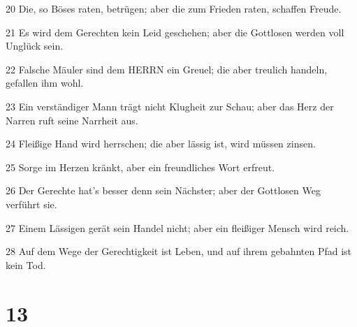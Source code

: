 \par 20 Die, so Böses raten, betrügen; aber die zum Frieden raten, schaffen Freude.
\par 21 Es wird dem Gerechten kein Leid geschehen; aber die Gottlosen werden voll Unglück sein.
\par 22 Falsche Mäuler sind dem HERRN ein Greuel; die aber treulich handeln, gefallen ihm wohl.
\par 23 Ein verständiger Mann trägt nicht Klugheit zur Schau; aber das Herz der Narren ruft seine Narrheit aus.
\par 24 Fleißige Hand wird herrschen; die aber lässig ist, wird müssen zinsen.
\par 25 Sorge im Herzen kränkt, aber ein freundliches Wort erfreut.
\par 26 Der Gerechte hat's besser denn sein Nächster; aber der Gottlosen Weg verführt sie.
\par 27 Einem Lässigen gerät sein Handel nicht; aber ein fleißiger Mensch wird reich.
\par 28 Auf dem Wege der Gerechtigkeit ist Leben, und auf ihrem gebahnten Pfad ist kein Tod.

\chapter{13}

